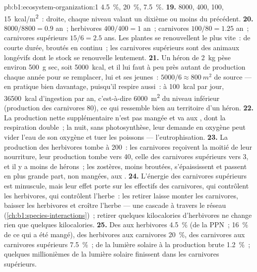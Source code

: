 \begin{solution}{pb:b1:ecosystem-organization:1}
\qty{4.5}{\%}, \qty{20}{\%}, \qty{7.5}{\%}.
\textbf{19.} \qty{8000}{}, \qty{400}{}, \qty{100}{}, \qty{15}{kcal/m^2}~:
droite, chaque niveau valant un dixième ou moins du précédent.
\textbf{20.}  $8000/8800 = 0.9$ an~; herbivores $400/400 =
1$ an~; carnivores $100/80 = 1.25$ an~; carnivores supérieurs $15/6 =
2.5$ ans. Les plantes se renouvellent le plus vite~:  de courte
durée, broutés en continu~; les carnivores supérieurs sont des animaux
longévifs dont le stock se renouvelle lentement.
\textbf{21.} Un héron de \qty{2}{kg} pèse environ \qty{500}{g} sec,
soit \qty{5000}{kcal}, et il lui faut à peu près autant de production
chaque année pour se remplacer, lui et ses jeunes~:
$5000/6 \approx \qty{800}{m^2}$ de source --- en pratique bien
davantage, puisqu'il respire aussi~: à \qty{100}{kcal} par jour,
\qty{36500}{kcal} d'ingestion par an, c'est-à-dire \qty{6000}{m^2} du
niveau inférieur (production des carnivores \qty{80}{}), ce qui
ressemble bien au territoire d'un héron.
\textbf{22.} La production nette supplémentaire n'est pas mangée et va
aux , dont la respiration double~; la nuit, sans
photosynthèse, leur demande en oxygène peut vider l'eau de son oxygène
et tuer les poissons --- l'eutrophisation.
\textbf{23.} La production des herbivores tombe à \qty{200}{}~: les
carnivores reçoivent la moitié de leur nourriture, leur production
tombe vers \qty{40}{}, celle des carnivores supérieurs vers 3, et il y
a moins de hérons~; les zostères, moins broutées, s'épaississent et
passent en plus grande part, non mangées, aux .
\textbf{24.} L'énergie des carnivores supérieurs est minuscule, mais
leur effet porte sur les effectifs des carnivores, qui contrôlent les
herbivores, qui contrôlent l'herbe~: les retirer laisse monter les
carnivores, baisser les herbivores et croître l'herbe --- une cascade à
travers le réseau (\cref{ch:b1:species-interactions})~; retirer
quelques kilocalories d'herbivores ne change rien que quelques
kilocalories.
\textbf{25.} Des  aux herbivores \qty{4.5}{\%} (de la PPN~;
\qty{16}{\%} de ce qui a été mangé), des herbivores aux carnivores
\qty{20}{\%}, des carnivores aux carnivores supérieurs \qty{7.5}{\%}~;
de la lumière solaire à la production brute \qty{1.2}{\%}~; quelques
millionièmes de la lumière solaire finissent dans les carnivores
supérieurs.
\end{solution}
